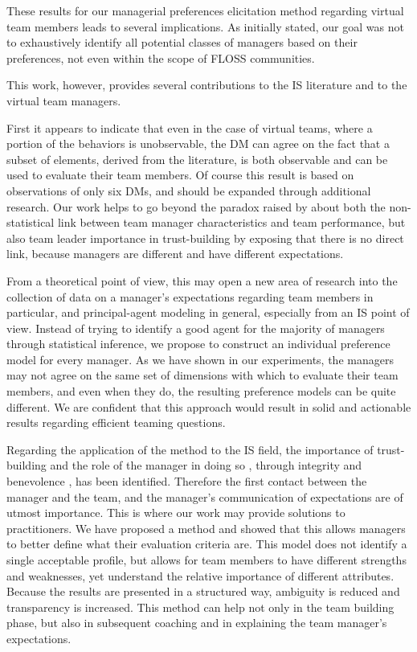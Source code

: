 These results for our managerial preferences elicitation method regarding virtual team members leads to several implications. As initially stated, our goal was not to exhaustively identify all potential classes of managers based on their preferences, not even within the scope of FLOSS communities.

This work, however, provides several contributions to the IS literature and to the virtual team managers.

First it appears to indicate that even in the case of virtual teams, where a portion of the behaviors is unobservable, the DM can agree on the fact that a subset of elements, derived from the literature, is both observable and can be used to evaluate their team members. Of course this result is based on observations of only six DMs, and should be expanded through additional research.
Our work helps to go beyond the paradox raised by \cite{KayworthLeidner02} about both the non-statistical link between team manager characteristics and team performance, but also team leader importance in trust-building by exposing that there is no direct link, because managers are different and have different expectations.

From a theoretical point of view, this may open a new area of research into the collection of data on a manager's expectations regarding team members in particular, and principal-agent modeling in general, especially from an IS point of view. Instead of trying to identify a good agent for the majority of managers through statistical inference, we propose to construct an individual preference model for every manager. As we have shown in our experiments, the managers may not agree on the same set of dimensions with which to evaluate their team members, and even when they do, the resulting preference models can be quite different.
We are confident that this approach would result in solid and actionable results regarding efficient teaming questions.

Regarding the application of the method to the IS field, the importance of trust-building and the role of the manager in doing so \citep{KayworthLeidner02}, through integrity and benevolence \citep{JarvenpaaKnollLeidner98}, has been identified. Therefore the first contact between the manager and the team, and the manager's communication of expectations are of utmost importance. This is where our work may provide solutions to practitioners. We have proposed a method and showed that this allows managers to better define what their evaluation criteria are. This model does not identify a single acceptable profile, but allows for team members to have different strengths and weaknesses, yet understand the relative importance of different attributes. Because the results are presented in a structured way, ambiguity is reduced and transparency is increased. This method can help not only in the team building phase, but also in subsequent coaching and in explaining the team manager's expectations.

